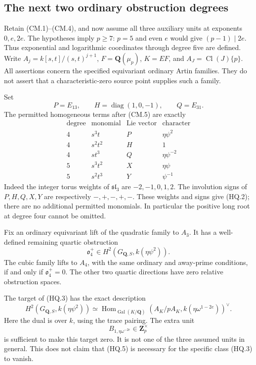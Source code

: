 \subsection{The next two ordinary obstruction degrees}
\label{sec:kt-quartic-quintic-obstruction}

Retain (CM.1)--(CM.4), and now assume all three auxiliary units
at exponents \(0,e,2e\).  The hypotheses imply \(p\ge7\):
\(p=5\) and even \(e\) would give \((p-1)\mid2e\).
Thus exponential and logarithmic coordinates through degree five
are defined.  Write \(A_j=k[s,t]/(s,t)^{j+1}\),
\(F=\mathbf Q(\mu_p)\), \(K=EF\), and
\(A_J=\operatorname{Cl}(J)\{p\}\).
All assertions concern the specified equivariant ordinary Artin
families.  They do not assert that a characteristic-zero source
point supplies such a family.

Set
\[
 P=E_{13},\qquad H=\operatorname{diag}(1,0,-1),\qquad Q=E_{31}.
                                                        \tag{HQ.1}
\]
The permitted homogeneous terms after (CM.5) are exactly
\[
 \begin{array}{c|c|c|c}
 \text{degree}&\text{monomial}&\text{Lie vector}&\text{character}\\\hline
 4&s^3t&P&\eta\psi^2\\
 4&s^2t^2&H&1\\
 4&st^3&Q&\eta\psi^{-2}\\
 5&s^3t^2&X&\eta\psi\\
 5&s^2t^3&Y&\psi^{-1}
 \end{array}                                             \tag{HQ.2}
\]
Indeed the integer torus weights of \(\mathfrak{sl}_3\)
are \(-2,-1,0,1,2\).  The involution signs of
\(P,H,Q,X,Y\) are respectively \(-,+,-,+,-\).
These weights and signs give (HQ.2); there are no additional
permitted monomials.  In particular the positive long root
at degree four cannot be omitted.

\begin{theorem}
Fix an ordinary equivariant lift of the quadratic family to
\(A_3\).  It has a well-defined remaining quartic obstruction
\[
 \mathfrak o_4^+\in H^2(G_{\mathbf Q,S},k(\eta\psi^2)).
                                                        \tag{HQ.3}
\]
The cubic family lifts to \(A_4\), with the same ordinary
and away-prime conditions, if and only if
\(\mathfrak o_4^+=0\).  The other two quartic directions
have zero relative obstruction spaces.

The target of (HQ.3) has the exact description
\[
 H^2(G_{\mathbf Q,S},k(\eta\psi^2))
 \simeq
 \operatorname{Hom}_{\operatorname{Gal}(K/\mathbf Q)}
       (A_K/pA_K,k(\eta\omega^{1-2e}))^\vee.
                                                        \tag{HQ.4}
\]
Here the dual is over \(k\), using the trace pairing.
The extra unit
\[
                       B_{1,\eta\omega^{-2e}}\in\mathbf Z_p^\times
                                                        \tag{HQ.5}
\]
is sufficient to make this target zero.  It is not one of
the three assumed units in general.  This does not claim
that (HQ.5) is necessary for the specific class (HQ.3)
to vanish.
\end{theorem}

